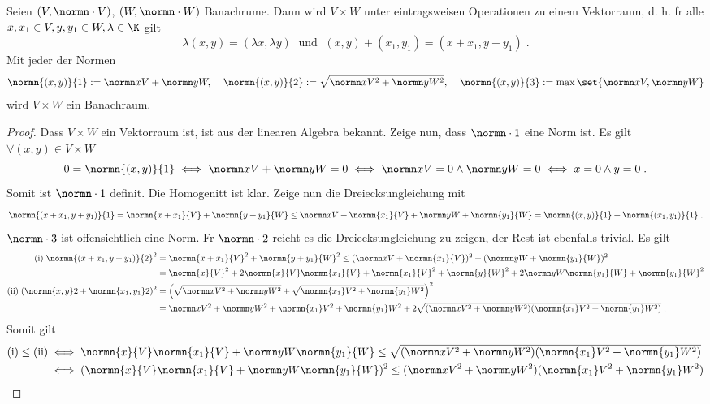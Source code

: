 \begin{theorem}
	Seien \((V,\normn\cdot V)\), \((W,\normn\cdot W)\) Banachr\as ume. Dann wird \(V \times W\) unter eintragsweisen Operationen zu einem Vektorraum, d. h. 
	f\us r alle \( x,x_1\in V, y,y_1 \in W, \lambda \in \K\) gilt
	\[ \lambda(x, y) = (\lambda x, \lambda y) \;\text{ und }\;(x, y) + (x_1, y_1) = (x + x_1 , y+ y_1 )\;.\] 
	Mit jeder der Normen
	\[\normn{(x,y)}{1} := \normn xV + \normn yW ,\;\;\;\; \normn{(x,y)}{2} := \sqrt{\normn xV ^2 + \normn yW ^2},\;\;\;\; \normn{(x,y)}{3} := \max\set{\normn xV, \normn yW}\]
	wird \(V\times W\) ein Banachraum.
\end{theorem}
\begin{proof}
	Dass \(V\times W\) ein Vektorraum ist, ist aus der linearen Algebra bekannt. Zeige nun, dass \(\normn\cdot 1\) eine Norm ist. Es gilt \(\forall (x,y)\in V\times W\)
	\[0 = \normn{(x,y)}{1} \iff \normn xV + \normn yW = 0 \iff \normn xV = 0 \land \normn yW = 0 \iff x = 0 \land y = 0\;.\]
	Somit ist \(\normn\cdot 1\) definit. Die Homogenit\as t ist klar. Zeige nun die Dreiecksungleichung mit  
	\[\normn{(x + x_1, y+ y_1 )}{1} = \normn{x+ x_1}{V} + \normn{y+y_1}{W} \leq \normn xV + \normn{x_1}{V} + \normn yW + \normn{y_1}{W} = \normn{(x,y)}{1} + \normn{(x_1, y_1)}{1}\;.\]
	\(\normn\cdot 3\) ist offensichtlich eine Norm. F\us r \(\normn \cdot 2\) reicht es die Dreiecksungleichung zu zeigen, der Rest ist ebenfalls trivial. Es gilt
	\begin{align*} 
	\text{(i)}\;\normn{(x+x_1,y+y_1)}{2}^2& = \normn{x + x_1}{V}^2 + \normn{y + y_1}{W}^2 \leq (\normn xV + \normn{x_1}{V})^2 + (\normn yW  + \normn{y_1}{W})^2 \\
	&= \normn{x}{V}^2 + 2 \normn{x}{V}\normn{x_1}{V} + \normn{x_1}{V}^2 + \normn{y}{W}^2 + 2\normn yW \normn{y_1}{W} + \normn{y_1}{W}^2 \\
	\text{(ii)}\;(\normn{x,y}2 + \normn{x_1,y_1}2)^2 & = \left( \sqrt{\normn xV^2 + \normn yW^2} + \sqrt{\normn{x_1}V^2 + \normn{y_1}W^2}\right)^2 \\
	&= \normn xV^2 + \normn yW^2	 + \normn{x_1}V^2 + \normn{y_1}W^2 + 2 \sqrt{(\normn xV^2 + \normn yW^2)(\normn{x_1}V^2 + \normn{y_1}W^2)} \;.
	\end{align*}
	Somit gilt 
	\begin{align*}
	\text{(i)} \leq \text{(ii)} &\iff\normn{x}{V}\normn{x_1}{V} + \normn yW \normn{y_1}{W} \leq \sqrt{(\normn xV^2 + \normn yW^2)(\normn{x_1}V^2 + \normn{y_1}W^2)}  \\
	& \iff (\normn{x}{V}\normn{x_1}{V} + \normn yW \normn{y_1}{W})^2 \leq (\normn xV^2 + \normn yW^2)(\normn{x_1}V^2 + \normn{y_1}W^2) \\

\end{align*}
\end{proof}
